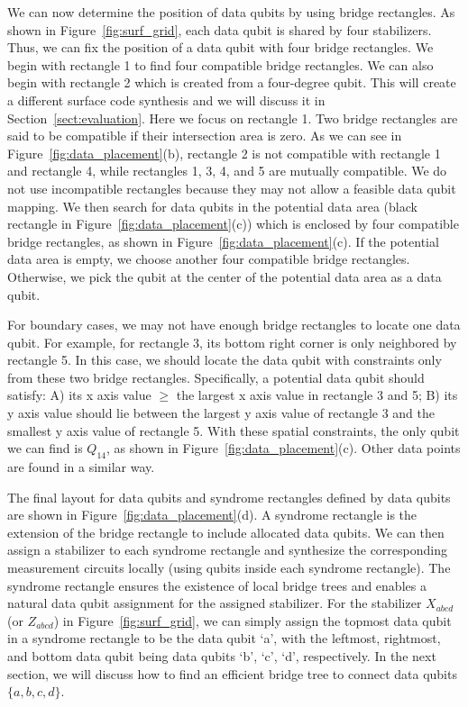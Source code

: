 We can now determine the position of data qubits by using bridge rectangles. 
As shown in Figure~\ref{fig:surf_grid}, each data qubit is shared by four stabilizers. Thus, we can fix the position of a data qubit with four bridge rectangles. We begin with rectangle 1 to find four compatible bridge rectangles.
We can also begin with rectangle 2 which is created from a four-degree qubit. This will create a different surface code synthesis and we will discuss it in Section~\ref{sect:evaluation}. Here we focus on rectangle 1. Two bridge rectangles are said to be compatible if their intersection area is zero. As we can see in Figure~\ref{fig:data_placement}(b), rectangle 2 is not compatible with rectangle 1 and rectangle 4, while rectangles 1, 3, 4, and 5 are mutually compatible. We do not use incompatible rectangles because they may not allow a feasible data qubit mapping.
We then search for data qubits in the potential data area (black  rectangle in Figure~\ref{fig:data_placement}(c)) which is enclosed by four compatible bridge rectangles, as shown in Figure~\ref{fig:data_placement}(c). If the potential data area is empty, we choose another four compatible bridge rectangles. Otherwise,
we pick the qubit at the center of the potential data area as a data qubit. 

For boundary cases, we may not have enough bridge rectangles to locate one data qubit. For example, for rectangle 3, its bottom right corner is only neighbored by rectangle 5. In this case, we should locate the data qubit with constraints only from these two bridge rectangles. Specifically, a potential data qubit should satisfy: A) its x axis value $\ge$ the largest x axis value in rectangle 3 and 5; B) its y axis value should lie between the largest y axis value of rectangle 3 and the smallest y axis value of rectangle 5.  With these spatial constraints, the only qubit we can find is $Q_{14}$, as shown in Figure~\ref{fig:data_placement}(c). Other data points are found in a similar way. 

The final layout for data qubits and syndrome rectangles defined by data qubits are shown in Figure~\ref{fig:data_placement}(d). 
A syndrome rectangle is 
the extension of the bridge rectangle to include  allocated data qubits. We can then assign a stabilizer to each syndrome rectangle and synthesize the corresponding measurement circuits locally (using qubits inside each syndrome rectangle). The syndrome rectangle ensures the existence of local bridge trees and enables a natural data qubit assignment for the assigned stabilizer. For the stabilizer $X_{abcd}$ (or $Z_{abcd}$) in Figure~\ref{fig:surf_grid},
we can simply assign the topmost data qubit in a syndrome rectangle to be the data qubit `a', with the leftmost, rightmost, and bottom data qubit being data qubits `b', `c', `d', respectively. In the next section, we will discuss how to find an efficient bridge tree to connect data qubits $\{a,b,c,d\}$.








